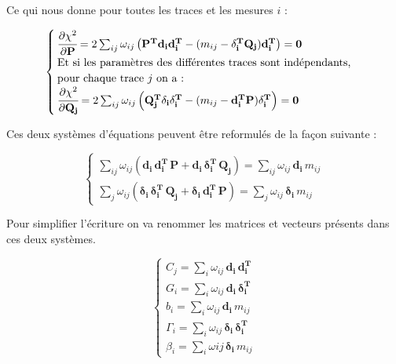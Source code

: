 \begin{appendices}
   \medskip
   
   Ce qui nous donne pour toutes les traces et les mesures $i$ :
  
   \begin{equation}
   \begin{cases}
     \cfrac{\partial \chi^2 }{\partial \mathbf{P} } = 2 \sum_{ij} \omega_{ij} \left( \mathbf{P^T} \mathbf{d_i} \mathbf{d_i^T} - (m_{ij} - \mathbf{\delta_i^T} \mathbf{Q_j} ) \mathbf{d_i^T} \right) = \mathbf{0} \\
     \text{Et si les param\`etres des diff\'erentes traces sont ind\'ependants,} \\
     \text{pour chaque trace $j$ on a :} \\
     \cfrac{\partial \chi^2 }{\partial \mathbf{Q_j} } = 2 \sum_{ij} \omega_{ij} \left( \mathbf{Q_j^T} \mathbf{\delta_i} \mathbf{\delta_i^T} - ( m_{ij} - \mathbf{d_i^T} \mathbf{P} ) \mathbf{\delta_i^T} \right) = \mathbf{0}
   \end{cases}
   \label{eq:syst_millepde}
   \end{equation}

   Ces deux syst\`emes d'\'equations peuvent \^etre reformul\'es de la fa\c{c}on suivante :
   
   \begin{equation}
   \begin{cases}
   \sum_{ij} \omega_{ij} \left( \mathbf{d_i} \, \mathbf{d_i^T} \, \mathbf{P} + \mathbf{d_i} \, \mathbf{\delta_i^T} \, \mathbf{Q_j} \right) = \sum_{ij} \omega_{ij} \, \mathbf{d_i} \, m_{ij} \\
   \sum_j \omega_{ij} \left( \mathbf{\delta_i} \, \mathbf{\delta_i^T} \, \mathbf{Q_j} + \mathbf{\delta_i} \, \mathbf{d_i^T} \, \mathbf{P} \right) = \sum_j \omega_{ij} \, \mathbf{\delta_i} \, m_{ij}
   \end{cases}
   \end{equation}
   
   Pour simplifier l'\'ecriture on va renommer les matrices et vecteurs pr\'esents dans ces deux syst\`emes.
   
   \begin{equation}
    \begin{cases}
     C_j = \sum_i \omega_{ij} \, \mathbf{d_i} \, \mathbf{d_i^T} \\
     G_i = \sum_i \omega_{ij} \, \mathbf{d_i} \, \mathbf{\delta_i^T} \\
     b_i = \sum_i \omega_{ij} \, \mathbf{d_i} \, m_{ij} \\
     \Gamma_i = \sum_i \omega_{ij} \, \mathbf{\delta_i} \, \mathbf{\delta_i^T} \\
     \beta_i = \sum_i \omega{ij} \, \mathbf{\delta_i} \, m_{ij}
    \end{cases}
   \end{equation}


\end{appendices}
